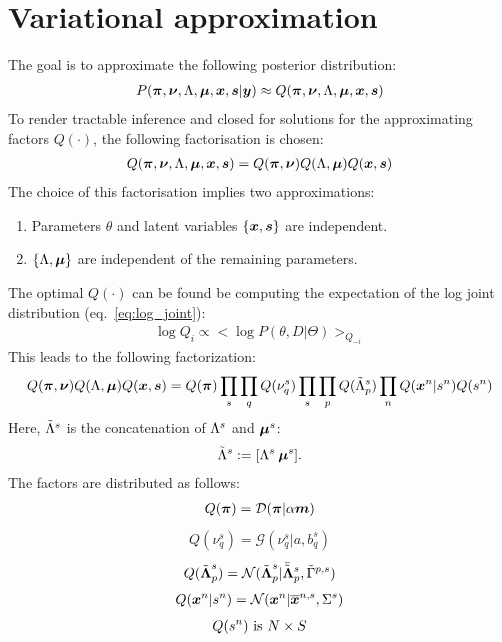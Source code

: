 \documentclass[a4paper]{article}
\begin{document}
\section{Variational approximation}
The goal is to approximate the following posterior distribution:
\begin{align}
  P(\boldsymbol{\pi},\boldsymbol{\nu},\Lambda,\boldsymbol{\mu},\boldsymbol{x},\boldsymbol{s}|\boldsymbol{y}) \approx Q(\boldsymbol{\pi},\boldsymbol{\nu},\Lambda,\boldsymbol{\mu},\boldsymbol{x},\boldsymbol{s})
\end{align}
To render tractable inference and closed for solutions for the approximating factors $Q(\cdot)$, the following factorisation is chosen:
\begin{align}
  Q(\boldsymbol{\pi},\boldsymbol{\nu},\Lambda,\boldsymbol{\mu},\boldsymbol{x},\boldsymbol{s})=Q(\boldsymbol{\pi},\boldsymbol{\nu})Q(\Lambda,\boldsymbol{\mu})Q(\boldsymbol{x},\boldsymbol{s})
\end{align}
The choice of this factorisation implies two approximations:
\begin{enumerate}
  \item Parameters $\theta$ and latent variables $\left\{\boldsymbol{x},\boldsymbol{s}\right\}$ are independent.
  \item $\left\{\Lambda,\boldsymbol{\mu}\right\}$ are independent of the remaining parameters.
\end{enumerate}
The optimal $Q(\cdot)$ can be found be computing the expectation of the log joint distribution (eq.~\ref{eq:log_joint}):
\begin{align}
  \log Q_i \propto <\log P(\theta,D|\Theta)>_{Q_{-i}}
\end{align}
This leads to the following factorization:
\begin{align}
  Q(\boldsymbol{\pi},\boldsymbol{\nu})Q(\Lambda,\boldsymbol{\mu})Q(\boldsymbol{x},\boldsymbol{s})=Q(\boldsymbol{\pi})\prod_s\prod_q Q(\nu_q^s)\prod_s\prod_p Q(\tilde{\Lambda}^s_p) \prod_n Q(\boldsymbol{x}^n|s^n)Q(s^n)
\end{align}
Here, $\tilde{\Lambda}^s$ is the concatenation of $\Lambda^s$ and $\boldsymbol{\mu}^s$:
\begin{align}
  \tilde{\Lambda}^s:=[\Lambda^s \: \boldsymbol{\mu}^s].
\end{align}
The factors are distributed as follows:
\begin{align}
  Q(\boldsymbol{\pi})=\mathcal{D}(\boldsymbol{\pi}|\alpha\boldsymbol{m})
\end{align}
\begin{align}
 Q(\nu^s_q)=\mathcal{G}(\nu^s_q|a, b_q^s)
\end{align}
\begin{align}
  Q(\tilde{\boldsymbol{\Lambda}}^s_p)=\mathcal{N}(\tilde{\boldsymbol{\Lambda}}^s_p|\bar{\tilde{\boldsymbol{\Lambda}}}^s_p,\tilde{\Gamma}^{p,s})
\end{align}
\begin{align}
  Q(\boldsymbol{x}^n|s^n)=\mathcal{N}(\boldsymbol{x}^n|\overline{\boldsymbol{x}}^{n,s},\Sigma^s)
\end{align}
\begin{align}
  Q(s^n)\text{ is }N\times S
\end{align}
\end{document}
